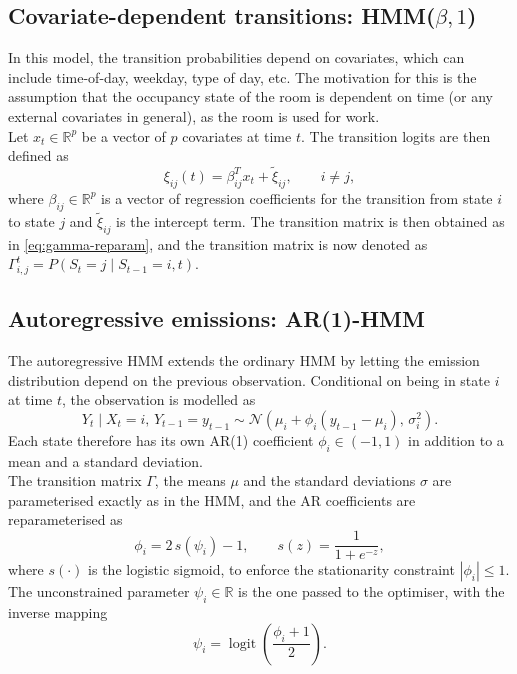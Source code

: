 \subsection{Covariate-dependent transitions: \texorpdfstring{HMM($\beta, 1$)}{HMM(beta)}} \label{sec:hmm(b)-theory}
In this model, the transition probabilities depend on covariates, which can include
time-of-day, weekday, type of day, etc. The motivation for this is the assumption
that the occupancy state of the room is dependent
on time (or any external covariates in general), as the room is used for work.  \\

Let $x_t \in \mathbb{R}^{p}$ be a vector of $p$ covariates at time $t$.
The transition logits are then defined as
\begin{equation}
    \xi_{ij}(t) = \beta_{ij}^{T} x_t + \tilde{\xi}_{ij}, \qquad i \neq j,
\end{equation}
where $\beta_{ij} \in \mathbb{R}^{p}$ is a vector of regression 
coefficients for the transition from state $i$ to state $j$ and 
$\tilde{\xi}_{ij}$ is the intercept term. 
The transition matrix is then obtained as in \cref{eq:gamma-reparam}, and the transition matrix is now
denoted as $\Gamma^t_{i,j} = P(S_{t} = j \mid S_{t-1} = i, t)$.


\subsection{Autoregressive emissions: AR(1)-HMM}\label{sec:ar-hmm-theory}
The autoregressive HMM extends the ordinary HMM by letting the emission
distribution depend on the previous observation. Conditional on being in state $i$ at time
$t$, the observation is modelled as
\begin{equation}
    Y_t \mid X_t = i,\, Y_{t-1} = y_{t-1} \sim
    \mathcal{N}\!\left( \mu_i + \phi_i \left( y_{t-1} - \mu_i \right),\, \sigma_i^2 \right).
    \label{eq:ar-emission}
\end{equation}
Each state therefore has its own AR(1) coefficient $\phi_i \in (-1, 1)$ in addition to a
mean and a standard deviation. \\
The transition matrix $\Gamma$, the means $\mu$ and the standard deviations $\sigma$ are parameterised
exactly as in the HMM, and the AR coefficients are reparameterised as
\begin{equation}
    \phi_i = 2\, s(\psi_i) - 1, \qquad s(z) = \frac{1}{1 + e^{-z}},
    \label{eq:phi-reparam}
\end{equation}
where $s(\cdot)$ is the logistic sigmoid, to enforce the stationarity constraint
$|\phi_i| \leq 1$. The unconstrained parameter $\psi_i \in \mathbb{R}$ is the one passed to the
optimiser, with the inverse mapping
\begin{equation}
    \psi_i = \operatorname{logit}\!\left( \frac{\phi_i + 1}{2} \right).
\end{equation}
